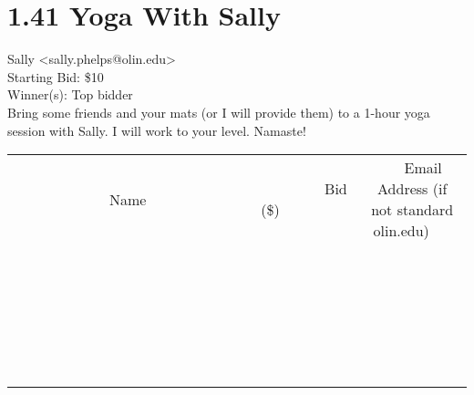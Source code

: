 \documentclass[11pt]{article}
\begin{document}
					\section*{1.41 Yoga With Sally}
					Sally <sally.phelps@olin.edu> \\
					Starting Bid: \$10 \\
					Winner(s): Top bidder \\
					Bring some friends and your mats (or I will provide them) to a 1-hour yoga session with Sally.  I will work to your level.  Namaste! \\
					[6ex]
					\begin{tabular}{c c c}
						~~~~~~~~~~~~~Name~~~~~~~~~~~~~ & ~~~~~~~~~Bid (\$)~~~~~~~~~ & ~~~Email Address (if not standard olin.edu)~~~ \\
				
 & & \\
\hline
 & & \\
\hline
 & & \\
\hline
 & & \\
\hline
 & & \\
\hline
 & & \\
\hline
 & & \\
\hline
 & & \\
\hline
 & & \\
\hline
 & & \\
\hline
 & & \\
\hline
 & & \\
\hline
 & & \\
\hline
 & & \\
\hline
 & & \\
\hline
 & & \\
\hline
 & & \\
\hline
 & & \\
\hline
 & & \\
\hline
 & & \\
\hline
 & & \\
\hline
 & & \\
\hline
 & & \\
\hline
 & & \\
\hline
 & & \\
\hline
 & & \\
\hline
					\end{tabular}
					\clearpage
				
\end{document}
